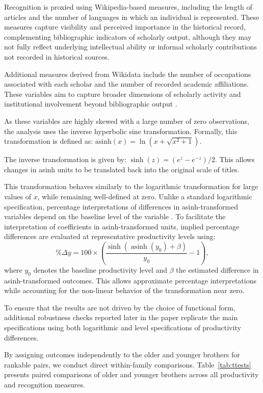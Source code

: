 Recognition is proxied using Wikipedia-based measures, including the length of articles and the number of languages in which an individual is represented. These measures capture visibility and perceived importance in the historical record, complementing bibliographic indicators of scholarly output, although they may not fully reflect underlying intellectual ability or informal scholarly contributions not recorded in historical sources.

Additional measures derived from Wikidata include the number of occupations associated with each scholar and the number of recorded academic affiliations. These variables aim to capture broader dimensions of scholarly activity and institutional involvement beyond bibliographic output \citep{curtis2026academic}.

As these variables are highly skewed with a large number of zero observations, the analysis uses the inverse hyperbolic sine transformation. Formally, this transformation is defined as: $\text{asinh}(x)=\ln(x+\sqrt{x^2+1})$.

The inverse transformation is given by: $\sinh(z)=(e^z-e^{-z})/2$. This allows changes in asinh units to be translated back into the original scale of titles.

This transformation behaves similarly to the logarithmic transformation for large values of $x$, while remaining well-defined at zero. Unlike a standard logarithmic specification, percentage interpretations of differences in asinh-transformed variables depend on the baseline level of the variable \citep{aihounton2021units}. To facilitate the interpretation of coefficients in asinh-transformed units, implied percentage differences are evaluated at representative productivity levels using:
\[
\%\Delta y
=
100 \times
\left(
\frac{
\sinh\left(
\operatorname{asinh}(y_0)+\beta
\right)
}{
y_0
}
-1
\right),
\]
where $y_0$ denotes the baseline productivity level and $\beta$ the estimated difference in asinh-transformed outcomes. This allows approximate percentage interpretations while accounting for the non-linear behavior of the transformation near zero.

To ensure that the results are not driven by the choice of functional form, additional robustness checks reported later in the paper replicate the main specifications using both logarithmic and level specifications of productivity differences.

By assigning outcomes independently to the older and younger brothers for rankable pairs, we conduct direct within-family comparisons. Table~\ref{tab:ttests} presents paired comparisons of older and younger brothers across all productivity and recognition measures.

